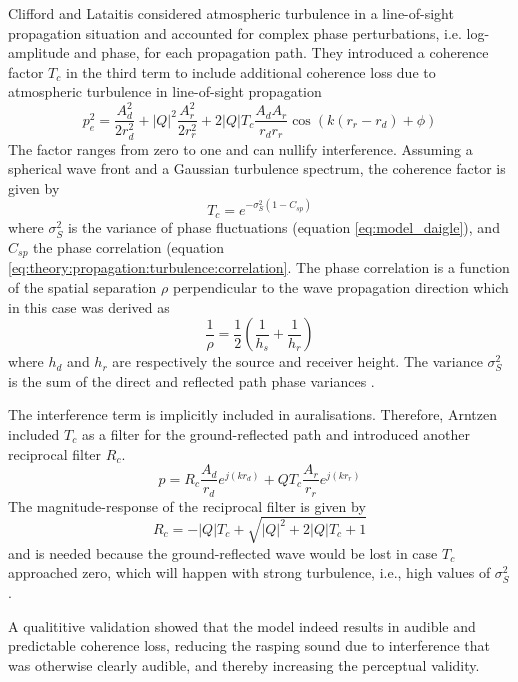 Clifford and Lataitis considered atmospheric turbulence in a line-of-sight
propagation situation and accounted for complex phase perturbations, i.e.
log-amplitude and phase, for each propagation path. They introduced a coherence
factor $T_c$ in the third term to include additional coherence loss due to
atmospheric turbulence in line-of-sight propagation
\begin{equation}
  p_{e}^2 = \frac{A_d^2}{2 r_d^2} + |Q|^2 \frac{A_r^2}{2 r_r^2} + 2 |Q| T_c \frac{A_d A_r}{r_d r_r} \cos{\left(k \left( r_r - r_d \right) + \phi  \right)}
\end{equation}
The factor ranges from zero to one and can nullify interference.
Assuming a spherical wave front and a Gaussian turbulence spectrum, the coherence factor is given by
\begin{equation}
  T_c = e^{-\sigma_S^2 \left(1 - C_{sp}\right)}
\end{equation}
where $\sigma_S^2$ is the variance of phase fluctuations (equation
\eqref{eq:model_daigle}), and $C_{sp}$ the phase correlation (equation
\eqref{eq:theory:propagation:turbulence:correlation}. The phase correlation is a function of the spatial separation $\rho$
perpendicular to the wave propagation direction which in this case was derived as
\begin{equation}
  \frac{1}{\rho} = \frac{1}{2} \left( \frac{1}{h_s} + \frac{1}{h_r}  \right)
\end{equation}
where $h_d$ and $h_r$ are respectively the source and receiver height.
The variance $\sigma_S^2$ is the sum of the direct and reflected path phase variances \cite{Clifford1983}.

The interference term is implicitly included in auralisations. Therefore,
Arntzen included $T_c$ as a filter for the ground-reflected path and introduced
another reciprocal filter $R_c$.
\begin{equation}
  p = R_c \frac{A_d}{r_d} e^{j\left(k r_d \right) } + Q T_c \frac{A_r}{r_r} e^{j\left(k r_r \right) }
\end{equation}
The magnitude-response of the reciprocal filter is given by
\begin{equation}
  R_c = - |Q| T_c + \sqrt{|Q|^2 + 2 |Q| T_c + 1}
\end{equation}
and is needed because the ground-reflected wave would be lost in case $T_c$ approached
zero, which will happen with strong turbulence, i.e., high values of
$\sigma^2_S$.

A qualititive validation showed that the model indeed results in audible and
predictable coherence loss, reducing the rasping sound due to interference that
was otherwise clearly audible, and thereby increasing the perceptual validity.


